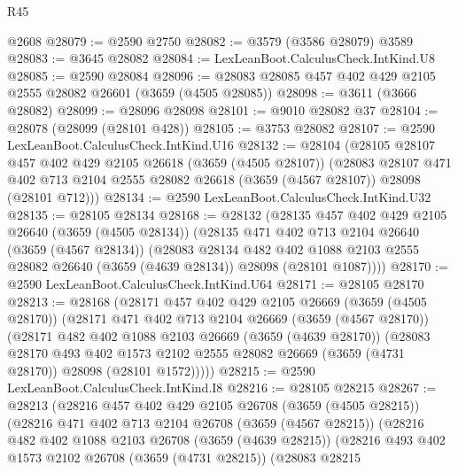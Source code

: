 \begin{lexlean}{R45}
\begin{coremodule}
    @2608
@28079 := @2590 @2750
@28082 := @3579 (@3586 @28079) @3589
@28083 := @3645 @28082
@28084 := LexLeanBoot.CalculusCheck.IntKind.U8
@28085 := @2590 @28084
@28096 := @28083 @28085 @457 @402 @429 @2105 @2555 @28082 @26601 (@3659 (@4505 @28085))
@28098 := @3611 (@3666 @28082)
@28099 := @28096 @28098
@28101 := @9010 @28082 @37
@28104 := @28078 (@28099 (@28101 @428))
@28105 := @3753 @28082
@28107 := @2590 LexLeanBoot.CalculusCheck.IntKind.U16
@28132 := @28104
    (@28105
      @28107
      @457
      @402
      @429
      @2105
      @26618
      (@3659 (@4505 @28107))
      (@28083
        @28107
        @471
        @402
        @713
        @2104
        @2555
        @28082
        @26618
        (@3659 (@4567 @28107))
        @28098
        (@28101 @712)))
@28134 := @2590 LexLeanBoot.CalculusCheck.IntKind.U32
@28135 := @28105 @28134
@28168 := @28132
    (@28135
      @457
      @402
      @429
      @2105
      @26640
      (@3659 (@4505 @28134))
      (@28135
        @471
        @402
        @713
        @2104
        @26640
        (@3659 (@4567 @28134))
        (@28083
          @28134
          @482
          @402
          @1088
          @2103
          @2555
          @28082
          @26640
          (@3659 (@4639 @28134))
          @28098
          (@28101 @1087))))
@28170 := @2590 LexLeanBoot.CalculusCheck.IntKind.U64
@28171 := @28105 @28170
@28213 := @28168
    (@28171
      @457
      @402
      @429
      @2105
      @26669
      (@3659 (@4505 @28170))
      (@28171
        @471
        @402
        @713
        @2104
        @26669
        (@3659 (@4567 @28170))
        (@28171
          @482
          @402
          @1088
          @2103
          @26669
          (@3659 (@4639 @28170))
          (@28083
            @28170
            @493
            @402
            @1573
            @2102
            @2555
            @28082
            @26669
            (@3659 (@4731 @28170))
            @28098
            (@28101 @1572)))))
@28215 := @2590 LexLeanBoot.CalculusCheck.IntKind.I8
@28216 := @28105 @28215
@28267 := @28213
    (@28216
      @457
      @402
      @429
      @2105
      @26708
      (@3659 (@4505 @28215))
      (@28216
        @471
        @402
        @713
        @2104
        @26708
        (@3659 (@4567 @28215))
        (@28216
          @482
          @402
          @1088
          @2103
          @26708
          (@3659 (@4639 @28215))
          (@28216
            @493
            @402
            @1573
            @2102
            @26708
            (@3659 (@4731 @28215))
            (@28083
              @28215

\end{coremodule}
\end{lexlean}

